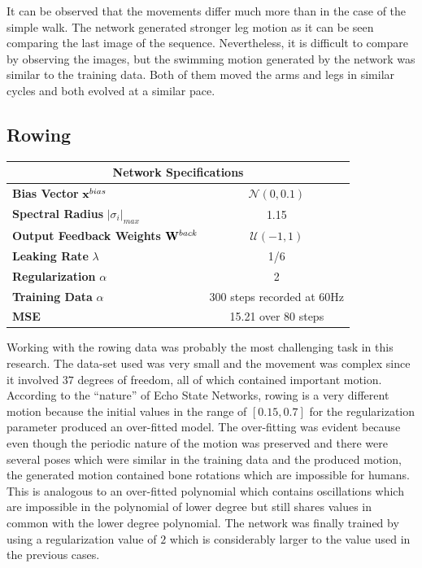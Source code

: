 \documentclass[letterpaper,9pt]{article}
\newcommand{\networkSpecs}[7]{
  \begin{center}
  \begin{tabular}{ | l | c | }
    \hline
    \multicolumn{2}{|c|}{{\bf Network Specifications}} \\
    \hline
    {\bf Bias Vector} ${\bf x}^{bias}$ & $\mathcal{N}(#1)$ \\
    \hline
    {\bf Spectral Radius} $|\sigma_i|_{max}$ & #2 \\
    \hline
    {\bf Output Feedback Weights} ${\bf W}^{back}$ & $\mathcal{U}(#3)$ \\
    \hline
    {\bf Leaking Rate} $\lambda$ & #4 \\
    \hline
    {\bf Regularization} $\alpha$ & #5\\
    \hline
    {\bf Training Data} $\alpha$ & #6\\
    \hline
    {\bf MSE} & #7\\
    \hline
  \end{tabular}    
  \end{center}
}
\begin{document}
It can be observed that the movements differ much more than in the case of the simple walk. The network generated stronger leg motion as it can be seen comparing the last image of the sequence. Nevertheless, it is difficult to compare by observing the images, but the swimming motion generated by the network was similar to the training data. Both of them moved the arms and legs in similar cycles and both evolved at a similar pace. 

\subsection{Rowing}

\networkSpecs{0,0.1}
             {1.15}
             {-1,1}
             {1/6}
             {2}
             {300 steps recorded at 60Hz}
             {15.21 over 80 steps}

Working with the rowing data was probably the most challenging task in this research. The data-set used was very small and the movement was complex since it involved $37$ degrees of freedom, all of which contained important motion. \\

According to the ``nature'' of Echo State Networks, rowing is a very different motion because the initial values in the range of $[0.15,0.7]$ for the regularization parameter produced an over-fitted model. The over-fitting was evident because even though the periodic nature of the motion was preserved and there were several poses which were similar in the training data and the produced motion, the generated motion contained bone rotations which are impossible for humans. This is analogous to an over-fitted polynomial which contains oscillations which are impossible in the polynomial of lower degree but still shares values in common with the lower degree polynomial. The network was finally trained by using a regularization value of $2$ which is considerably larger to the value used in the previous cases.\pagebreak
\end{document}
